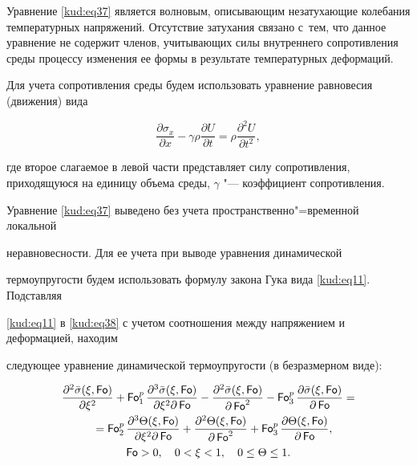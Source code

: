 Уравнение \eqref{kud:eq37} является волновым, описывающим незатухающие колебания температурных напряжений. Отсутствие затухания связано с~тем, что данное уравнение не содержит членов, учитывающих силы внутреннего сопротивления среды процессу изменения ее формы в результате температурных деформаций. 

Для учета сопротивления среды будем использовать уравнение равновесия (движения) вида

\begin{equation}

\label{kud:eq39}

\frac{\partial \sigma_x }{\partial x}-\gamma \rho \frac{\partial U}{\partial t}= {\rho }\frac{\partial^2U}{\partial

t^2},

\end{equation}

где второе слагаемое в левой части представляет силу сопротивления, приходящуюся на единицу объема среды,  $\gamma$ "--- коэффициент сопротивления.%





Уравнение \eqref{kud:eq37} выведено без учета пространственно"=временной локальной

неравновесности. Для ее учета при выводе уравнения динамической

термоупругости будем использовать формулу закона Гука вида \eqref{kud:eq11}. Подставляя

\eqref{kud:eq11} в \eqref{kud:eq38} с учетом соотношения между напряжением и деформацией, находим

следующее уравнение динамической термоупругости (в безразмерном виде):

\begin{gather}

\frac{\partial^2 \bar \sigma( \xi,\operatorname{\sf Fo})}{\partial  \xi^2}+\operatorname{\sf Fo}_1^p

\frac{\partial^3 \bar \sigma( \xi,\operatorname{\sf Fo})}{\partial  \xi^2\partial \operatorname{\sf Fo}}-

\frac{\partial^2 \bar \sigma( \xi,\operatorname{\sf Fo})}{\partial \operatorname{\sf Fo}^2}-\operatorname{\sf Fo}_3^p 

\frac{\partial  \bar \sigma( \xi,\operatorname{\sf Fo})}{\partial \operatorname{\sf Fo}}=\\

\label{kud:eq41}

\quad =

\operatorname{\sf Fo}_2^p \frac{\partial^3\Theta ( \xi,\operatorname{\sf Fo})}{\partial  \xi^2\partial \operatorname{\sf Fo}}+

\frac{\partial

^2\Theta ( \xi,\operatorname{\sf Fo})}{\partial

\operatorname{\sf Fo}^2}+\operatorname{\sf Fo}_3^p \frac{\partial \Theta ( \xi,\operatorname{\sf Fo})}{\partial \operatorname{\sf Fo}},\\

\operatorname{\sf Fo}>0, \quad  0< \xi<1, \quad  0\le  \Theta\le 1.

\end{gather}

